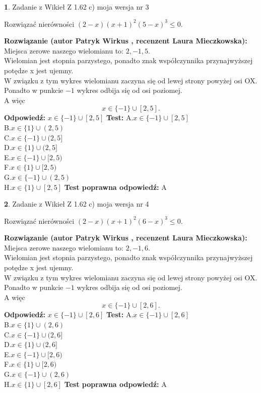 \documentclass[12pt, a4paper]{article}
\theoremstyle{definition} %
\newtheorem{zad}{}
\newcommand{\zadStart}[1]{\begin{zad}#1\newline}
\newcommand{\zadStop}{\end{zad}}
\newcommand{\rozwStart}[2]{\noindent \textbf{Rozwiązanie (autor #1 , recenzent #2): }\newline}
\newcommand{\rozwStop}{\newline}
\newcommand{\odpStart}{\noindent \textbf{Odpowiedź:}\newline}
\newcommand{\odpStop}{\newline}
\newcommand{\testStart}{\noindent \textbf{Test:}\newline}
\newcommand{\testStop}{\newline}
\newcommand{\kluczStart}{\noindent \textbf{Test poprawna odpowiedź:}\newline}
\newcommand{\kluczStop}{\newline}
\begin{document}
\zadStart{Zadanie z Wikieł Z 1.62 c) moja wersja nr 3}

Rozwiązać nierówności $(2-x)(x+1)^{2}(5-x)^{3}\le0$.
\zadStop
\rozwStart{Patryk Wirkus}{Laura Mieczkowska}
Miejsca zerowe naszego wielomianu to: $2, -1, 5$.\\
Wielomian jest stopnia parzystego, ponadto znak współczynnika przy\linebreak najwyższej potędze x jest ujemny.\\ W związku z tym wykres wielomianu zaczyna się od lewej strony powyżej osi OX.\\
Ponadto w punkcie $-1$ wykres odbija się od osi poziomej.\\
A więc $$x \in \{-1\} \cup [2,5].$$
\rozwStop
\odpStart
$x \in \{-1\} \cup [2,5]$
\odpStop
\testStart
A.$x \in \{-1\} \cup [2,5]$\\
B.$x \in \{1\} \cup (2,5)$\\
C.$x \in \{-1\} \cup (2,5]$\\
D.$x \in \{1\} \cup (2,5]$\\
E.$x \in \{-1\} \cup [2,5)$\\
F.$x \in \{1\} \cup [2,5)$\\
G.$x \in \{-1\} \cup (2,5)$\\
H.$x \in \{1\} \cup [2,5]$
\testStop
\kluczStart
A
\kluczStop



\zadStart{Zadanie z Wikieł Z 1.62 c) moja wersja nr 4}

Rozwiązać nierówności $(2-x)(x+1)^{2}(6-x)^{3}\le0$.
\zadStop
\rozwStart{Patryk Wirkus}{Laura Mieczkowska}
Miejsca zerowe naszego wielomianu to: $2, -1, 6$.\\
Wielomian jest stopnia parzystego, ponadto znak współczynnika przy\linebreak najwyższej potędze x jest ujemny.\\ W związku z tym wykres wielomianu zaczyna się od lewej strony powyżej osi OX.\\
Ponadto w punkcie $-1$ wykres odbija się od osi poziomej.\\
A więc $$x \in \{-1\} \cup [2,6].$$
\rozwStop
\odpStart
$x \in \{-1\} \cup [2,6]$
\odpStop
\testStart
A.$x \in \{-1\} \cup [2,6]$\\
B.$x \in \{1\} \cup (2,6)$\\
C.$x \in \{-1\} \cup (2,6]$\\
D.$x \in \{1\} \cup (2,6]$\\
E.$x \in \{-1\} \cup [2,6)$\\
F.$x \in \{1\} \cup [2,6)$\\
G.$x \in \{-1\} \cup (2,6)$\\
H.$x \in \{1\} \cup [2,6]$
\testStop
\kluczStart
A
\kluczStop
\end{document}

